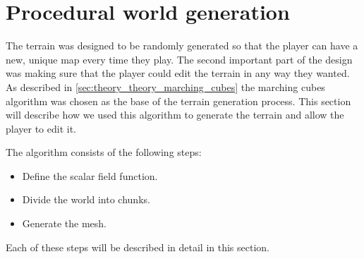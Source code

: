 \section{Procedural world generation} \label{sec:system_architecture_terrain}
The terrain was designed to be randomly generated so that the player can have a new, unique map every time they play.
The second important part of the design was making sure that the player could edit the terrain in any way they wanted.
As described in \autoref{sec:theory_theory_marching_cubes} the marching cubes algorithm was chosen as the base of the terrain generation process.
This section will describe how we used this algorithm to generate the terrain and allow the player to edit it.

The algorithm consists of the following steps:
\begin{itemize}
    \item Define the scalar field function.
    \item Divide the world into chunks.
    \item Generate the mesh.
\end{itemize}

Each of these steps will be described in detail in this section.





